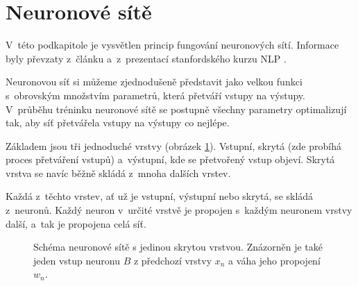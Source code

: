 \section{Neuronové sítě}
\label{neuronove_site}
V~této podkapitole je vysvětlen princip fungování neuronových sítí. Informace byly převzaty z~článku \cite{neural_nets} a~z~prezentací stanfordského kurzu NLP \cite{stanford:nlp}.\par
Neuronovou síť si můžeme zjednodušeně představit jako velkou funkci s~obrovským množstvím parametrů, která přetváří vstupy na výstupy. V~průběhu tréninku neuronové sítě se postupně všechny parametry optimalizují tak, aby síť přetvářela vstupy na výstupy co nejlépe.\par
Základem jsou tři jednoduché vrstvy (obrázek \ref{three_layers}). Vstupní, skrytá (zde probíhá proces přetváření vstupů) a~výstupní, kde se přetvořený vstup objeví. Skrytá vrstva se navíc běžně skládá z~mnoha dalších vrstev.\par
Každá z~těchto vrstev, ať už je vstupní, výstupní nebo skrytá, se skládá z~neuronů. Každý neuron v~určité vrstvě je propojen s~každým neuronem vrstvy další, a~tak je propojena celá síť.

\begin{figure}[hbt]
	\centering
	\caption{Schéma neuronové sítě s jedinou skrytou vrstvou. Znázorněn je také jeden vstup neuronu $B$ z předchozí vrstvy $x_n$ a váha jeho propojení $w_n$.}
	\label{three_layers}
\end{figure}


